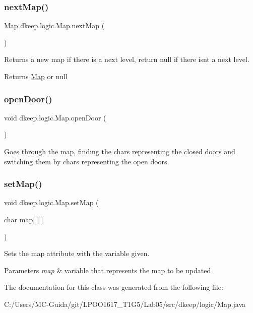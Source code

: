 \subsubsection{\texorpdfstring{next\+Map()}{nextMap()}}
{\footnotesize\ttfamily \hyperlink{classdkeep_1_1logic_1_1_map}{Map} dkeep.\+logic.\+Map.\+next\+Map (\begin{DoxyParamCaption}{ }\end{DoxyParamCaption})}

Returns a new map if there is a next level, return null if there isn\textquotesingle{}t a next level. \begin{DoxyReturn}{Returns}
\hyperlink{classdkeep_1_1logic_1_1_map}{Map} or null 
\end{DoxyReturn}
\mbox{\label{classdkeep_1_1logic_1_1_map_a2d626ecdbda836f971f08ad31eadbd7b}} 
\subsubsection{\texorpdfstring{open\+Door()}{openDoor()}}
{\footnotesize\ttfamily void dkeep.\+logic.\+Map.\+open\+Door (\begin{DoxyParamCaption}{ }\end{DoxyParamCaption})}

Goes through the map, finding the chars representing the closed doors and switching them by chars representing the open doors. \mbox{\label{classdkeep_1_1logic_1_1_map_af00c4221d9896abaa16dff00a462ba23}} 
\subsubsection{\texorpdfstring{set\+Map()}{setMap()}}
{\footnotesize\ttfamily void dkeep.\+logic.\+Map.\+set\+Map (\begin{DoxyParamCaption}\item[{char}]{map\mbox{[}$\,$\mbox{]}\mbox{[}$\,$\mbox{]} }\end{DoxyParamCaption})}

Sets the map attribute with the variable given. 
\begin{DoxyParams}{Parameters}
{\em map} & variable that represents the map to be updated \\
\hline
\end{DoxyParams}


The documentation for this class was generated from the following file\+:\begin{DoxyCompactItemize}
\item 
C\+:/\+Users/\+M\+C-\/\+Guida/git/\+L\+P\+O\+O1617\+\_\+\+T1\+G5/\+Lab05/src/dkeep/logic/Map.\+java\end{DoxyCompactItemize}
